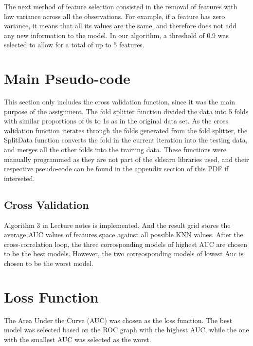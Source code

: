 \documentclass{article}
\begin{document}
The next method of feature selection consisted in the removal of features with low variance across all the observations. For example, if a feature has zero variance, it means that all its values are the same, and therefore does not add any new information to the model. In our algorithm, a threshold of 0.9 was selected to allow for a total of up to 5 features. 

 \section{Main Pseudo-code}
This section only includes the cross validation function, since it was the main purpose of the assignment. The fold splitter function divided the data into 5 folds with similar proportions of 0s to 1s as in the original data set. As the cross validation function iterates through the folds generated from the fold splitter, the SplitData function converts the fold in the current iteration into the testing data, and merges all the other folds into the training data. These functions were manually programmed as they are not part of the sklearn libraries used, and their respective pseudo-code can be found in the appendix section of this PDF if interseted. 


 \subsection{Cross Validation}
 
 Algorithm 3   in Lecture notes is implemented.
And the result grid stores the average  AUC values of features space against all possible KNN values.
After the cross-correlation loop, the three corrosponding models of highest  AUC are chosen to be the best models. However, the two correosponding models of lowest Auc is chosen to be the worst model.



\section{Loss Function }  
The Area Under the Curve (AUC) was chosen as the loss function. The best model was selected based on the ROC graph with the highest AUC, while the one with the smallest AUC was selected as the worst.
\end{document}

